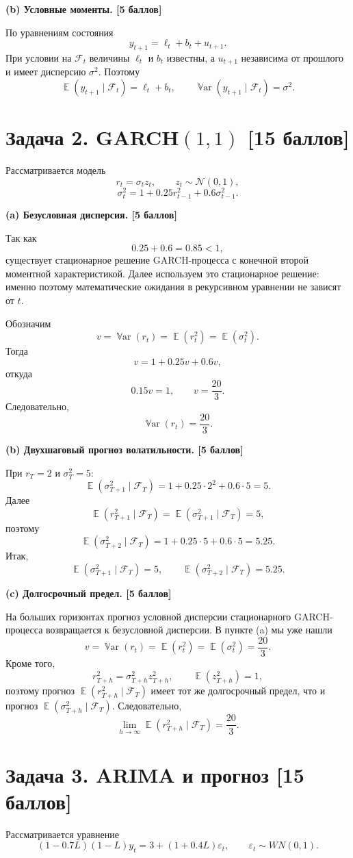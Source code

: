 \documentclass[12pt]{article}
\DeclareMathOperator{\Var}{\mathbb{V}ar}
\DeclareMathOperator{\E}{\mathbb{E}}
\newcommand \e{\varepsilon}
\newcommand \cN{\mathcal{N}}
\newcommand{\cF}{\mathcal{F}}
\newcommand{\step}[1]{\medskip\noindent\textbf{#1}\par\nobreak\vspace{2pt}}
\begin{document}
\step{(b) Условные моменты. \hfill [5 баллов]}
По уравнениям состояния
\[
y_{t+1}=\ell_t+b_t+u_{t+1}.
\]
При условии на $\cF_t$ величины $\ell_t$ и $b_t$ известны, а $u_{t+1}$ независима от прошлого и имеет дисперсию $\sigma^2$. Поэтому
\[
\boxed{\E(y_{t+1}\mid\cF_t)=\ell_t+b_t,\qquad
\Var(y_{t+1}\mid\cF_t)=\sigma^2.}
\]

\section*{Задача 2. GARCH$(1,1)$ \hfill [15 баллов]}

Рассматривается модель
\[
r_t=\sigma_tz_t,\qquad z_t\sim\cN(0,1),
\]
\[
\sigma_t^2=1+0.25r_{t-1}^2+0.6\sigma_{t-1}^2.
\]

\step{(a) Безусловная дисперсия. \hfill [5 баллов]}
Так как
\[
0.25+0.6=0.85<1,
\]
существует стационарное решение GARCH-процесса с конечной второй моментной характеристикой. Далее используем это стационарное решение: именно поэтому математические ожидания в рекурсивном уравнении не зависят от $t$.

Обозначим
\[
v=\Var(r_t)=\E(r_t^2)=\E(\sigma_t^2).
\]
Тогда
\[
v=1+0.25v+0.6v,
\]
откуда
\[
0.15v=1,\qquad v=\frac{20}{3}.
\]
Следовательно,
\[
\boxed{\Var(r_t)=\frac{20}{3}.}
\]

\step{(b) Двухшаговый прогноз волатильности. \hfill [5 баллов]}
При $r_T=2$ и $\sigma_T^2=5$:
\[
\E(\sigma_{T+1}^2\mid\cF_T)
=1+0.25\cdot 2^2+0.6\cdot 5=5.
\]
Далее
\[
\E(r_{T+1}^2\mid\cF_T)=\E(\sigma_{T+1}^2\mid\cF_T)=5,
\]
поэтому
\[
\E(\sigma_{T+2}^2\mid\cF_T)
=1+0.25\cdot 5+0.6\cdot 5=5.25.
\]
Итак,
\[
\boxed{\E(\sigma_{T+1}^2\mid\cF_T)=5,\qquad
\E(\sigma_{T+2}^2\mid\cF_T)=5.25.}
\]

\step{(c) Долгосрочный предел. \hfill [5 баллов]}
На больших горизонтах прогноз условной дисперсии стационарного GARCH-процесса возвращается к безусловной дисперсии. В пункте (a) мы уже нашли
\[
v=\Var(r_t)=\E(r_t^2)=\E(\sigma_t^2)=\frac{20}{3}.
\]
Кроме того,
\[
r_{T+h}^2=\sigma_{T+h}^2z_{T+h}^2,\qquad \E(z_{T+h}^2)=1,
\]
поэтому прогноз $\E(r_{T+h}^2\mid\cF_T)$ имеет тот же долгосрочный предел, что и прогноз $\E(\sigma_{T+h}^2\mid\cF_T)$. Следовательно,
\[
\boxed{\lim_{h\to\infty}\E(r_{T+h}^2\mid\cF_T)=\frac{20}{3}.}
\]

\section*{Задача 3. ARIMA и прогноз \hfill [15 баллов]}

Рассматривается уравнение
\[
(1-0.7L)(1-L)y_t=3+(1+0.4L)\e_t,\qquad \e_t\sim WN(0,1).
\]
\end{document}
